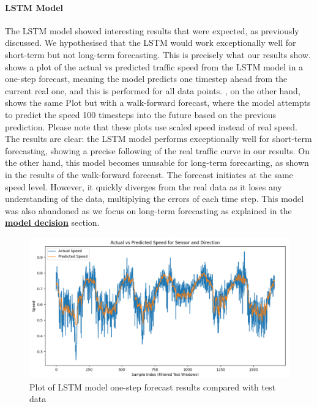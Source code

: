 \paragraph{LSTM Model}
\label{link:lstm-results}
The LSTM model showed interesting results that were expected, as previously discussed. We hypothesised that the LSTM would work exceptionally well for short-term but not long-term forecasting. This is precisely what our results show.  shows a plot of the actual vs predicted traffic speed from the LSTM model in a one-step forecast, meaning the model predicts one timestep ahead from the current real one, and this is performed for all data points. , on the other hand, shows the same Plot but with a walk-forward forecast, where the model attempts to predict the speed 100 timesteps into the future based on the previous prediction. Please note that these plots use scaled speed instead of real speed. The results are clear: the LSTM model performs exceptionally well for short-term forecasting, showing a precise following of the real traffic curve in our results.
On the other hand, this model becomes unusable for long-term forecasting, as shown in the results of the walk-forward forecast. The forecast initiates at the same speed level. However, it quickly diverges from the real data as it loses any understanding of the data, multiplying the errors of each time step. This model was also abandoned as we focus on long-term forecasting as explained in the \textbf{\hyperref[link:model-decision]{model decision}} section.

\begin{figure}[!ht]
  \centering
  \includegraphics[width=\textwidth]{images/results-discussions/1-state-predictions.pdf}
  \caption{Plot of LSTM model one-step forecast results compared with test data}
  \label{fig:lstm-1-state}
\end{figure}

